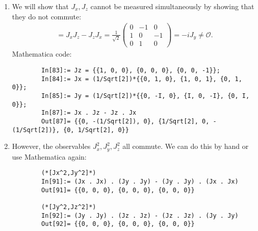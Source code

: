 \documentclass{article}
\theoremstyle{definition}
\newcommand{\f}[2]{\frac{#1}{#2}}
\begin{document}
\begin{enumerate}[label=(\alph*)]
	\item We will show that $J_x,J_z$ cannot be measured simultaneously by showing that they do not commute:
	\begin{align*}
		[J_x,J_z] = J_xJ_z - J_zJ_x = \f{1}{\sqrt{2}}\begin{pmatrix}
			0 & -1 & 0 \\
			1 & 0 & -1 \\
			0 & 1 & 0
		\end{pmatrix} = -i J_y \neq \mathcal{O}.
	\end{align*}
	Mathematica code:
	\begin{lstlisting}
		In[83]:= Jz = {{1, 0, 0}, {0, 0, 0}, {0, 0, -1}};
		In[84]:= Jx = (1/Sqrt[2])*{{0, 1, 0}, {1, 0, 1}, {0, 1, 0}};
		In[85]:= Jy = (1/Sqrt[2])*{{0, -I, 0}, {I, 0, -I}, {0, I, 0}};
		In[87]:= Jx . Jz - Jz . Jx
		Out[87]= {{0, -(1/Sqrt[2]), 0}, {1/Sqrt[2], 0, -(1/Sqrt[2])}, {0, 1/Sqrt[2], 0}}
	\end{lstlisting}
	
	\item However, the observables $J_x^2, J_y^2,J_z^2$ all commute. We can do this by hand or use Mathematica again:
	\begin{lstlisting}
		(*[Jx^2,Jy^2]*)
		In[91]:= (Jx . Jx) . (Jy . Jy) - (Jy . Jy) . (Jx . Jx)
		Out[91]= {{0, 0, 0}, {0, 0, 0}, {0, 0, 0}}
		
		(*[Jy^2,Jz^2]*)	
		In[92]:= (Jy . Jy) . (Jz . Jz) - (Jz . Jz) . (Jy . Jy)
		Out[92]= {{0, 0, 0}, {0, 0, 0}, {0, 0, 0}}
		

\end{lstlisting}
\end{enumerate}
\end{document}
